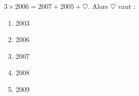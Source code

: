$3\times2006=2007+2005+\heartsuit$. Alors $\heartsuit$ vaut :
\begin{multicols}{5}
\begin{enumerate}[A/]
\item 2003
\item 2006
\item 2007
\item 2008
\item 2009
\end{enumerate}
\end{multicols}